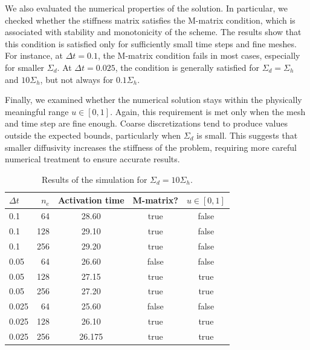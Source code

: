 \documentclass[unicode,11pt,a4paper,oneside,numbers=endperiod,openany]{article}
\begin{document}
We also evaluated the numerical properties of the solution. In particular, we
checked whether the stiffness matrix satisfies the M-matrix condition, which is
associated with stability and monotonicity of the scheme. The results show that
this condition is satisfied only for sufficiently small time steps and fine
meshes. For instance, at $\Delta t = 0.1$, the M-matrix condition fails in most
cases, especially for smaller $\Sigma_d$. At $\Delta t = 0.025$, the condition
is generally satisfied for $\Sigma_d = \Sigma_h$ and $10\Sigma_h$, but not
always for $0.1\Sigma_h$.

Finally, we examined whether the numerical solution stays within the physically
meaningful range $u \in [0, 1]$. Again, this requirement is met only when the
mesh and time step are fine enough. Coarse discretizations tend to produce
values outside the expected bounds, particularly when $\Sigma_d$ is small. This
suggests that smaller diffusivity increases the stiffness of the problem,
requiring more careful numerical treatment to ensure accurate results.

\begin{table}[H]
	\centering
	\caption{Results of the simulation for $\Sigma_d = 10\Sigma_h$.}
	\begin{tabular}{l|r|ccc}
		$\Delta t$ & $n_e$ & Activation time & M-matrix? & $u \in [0, 1]$ \\
		\hline
		0.1        & 64    & 28.60           & true      & false          \\
		0.1        & 128   & 29.10           & true      & false          \\
		0.1        & 256   & 29.20           & true      & false          \\
		0.05       & 64    & 26.60           & false     & false          \\
		0.05       & 128   & 27.15           & true      & true           \\
		0.05       & 256   & 27.20           & true      & true           \\
		0.025      & 64    & 25.60           & false     & false          \\
		0.025      & 128   & 26.10           & true      & true           \\
		0.025      & 256   & 26.175          & true      & true           \\
	\end{tabular}
\end{table}
\end{document}
